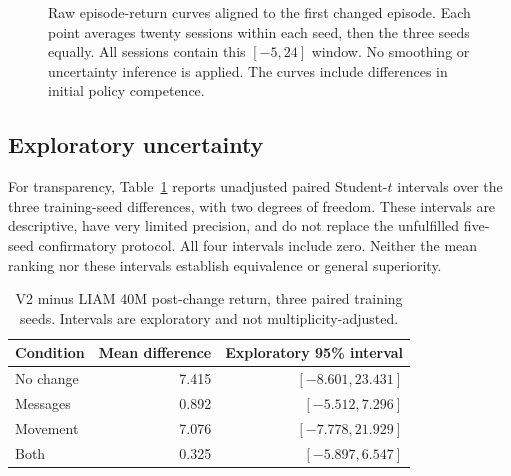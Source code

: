 \documentclass[10pt,a4paper]{article}
\begin{document}
\begin{figure}[ht]
\caption{Raw episode-return curves aligned to the first changed episode. Each point averages twenty sessions within each seed, then the three seeds equally. All sessions contain this $[-5,24]$ window. No smoothing or uncertainty inference is applied. The curves include differences in initial policy competence.}
\end{figure}

\subsection{Exploratory uncertainty}
For transparency, Table~\ref{tab:uncertainty} reports unadjusted paired Student-$t$ intervals over the three training-seed differences, with two degrees of freedom. These intervals are descriptive, have very limited precision, and do not replace the unfulfilled five-seed confirmatory protocol. All four intervals include zero. Neither the mean ranking nor these intervals establish equivalence or general superiority.
\begin{table}[ht]
\centering
\caption{V2 minus LIAM 40M post-change return, three paired training seeds. Intervals are exploratory and not multiplicity-adjusted.}
\label{tab:uncertainty}
\begin{tabular}{lrr}\toprule
Condition & Mean difference & Exploratory 95\% interval \\\midrule
No change & 7.415 & $[-8.601,23.431]$ \\
Messages & 0.892 & $[-5.512,7.296]$ \\
Movement & 7.076 & $[-7.778,21.929]$ \\
Both & 0.325 & $[-5.897,6.547]$ \\\bottomrule
\end{tabular}
\end{table}
\end{document}
